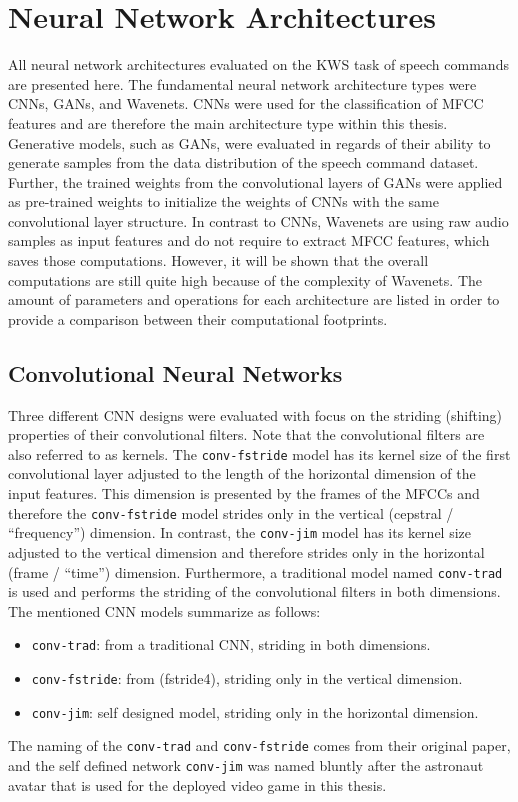
\section{Neural Network Architectures}\label{sec:nn_arch}
All neural network architectures evaluated on the KWS task of speech commands are presented here.
The fundamental neural network architecture types were CNNs, GANs, and Wavenets.
CNNs were used for the classification of MFCC features and are therefore the main architecture type within this thesis.
Generative models, such as GANs, were evaluated in regards of their ability to generate samples from the data distribution of the speech command dataset.
Further, the trained weights from the convolutional layers of GANs were applied as pre-trained weights to initialize the weights of CNNs with the same convolutional layer structure.
In contrast to CNNs, Wavenets are using raw audio samples as input features and do not require to extract MFCC features, which saves those computations.
However, it will be shown that the overall computations are still quite high because of the complexity of Wavenets.
The amount of parameters and operations for each architecture are listed in order to provide a comparison between their computational footprints.



\subsection{Convolutional Neural Networks}\label{sec:nn_arch_cnn}
Three different CNN designs were evaluated with focus on the striding (shifting) properties of their convolutional filters.
Note that the convolutional filters are also referred to as kernels.
The \texttt{conv-fstride} model has its kernel size of the first convolutional layer adjusted to the length of the horizontal dimension of the input features.
This dimension is presented by the frames of the MFCCs and therefore the \texttt{conv-fstride} model strides only in the vertical (cepstral / \enquote{frequency}) dimension.
In contrast, the \texttt{conv-jim} model has its kernel size adjusted to the vertical dimension and therefore strides only in the horizontal (frame / \enquote{time}) dimension.
Furthermore, a traditional model named \texttt{conv-trad} is used and performs the striding of the convolutional filters in both dimensions.
The mentioned CNN models summarize as follows:
\begin{itemize}
	\item \texttt{conv-trad}: from \cite{Sainath2015} a traditional CNN, striding in both dimensions.
	\item \texttt{conv-fstride}: from \cite{Sainath2015} (fstride4), striding only in the vertical dimension.
	\item \texttt{conv-jim}: self designed model, striding only in the horizontal dimension.
\end{itemize}
The naming of the \texttt{conv-trad} and \texttt{conv-fstride} comes from their original paper, and the self defined network \texttt{conv-jim} was named bluntly after the astronaut avatar that is used for the deployed video game in this thesis.

